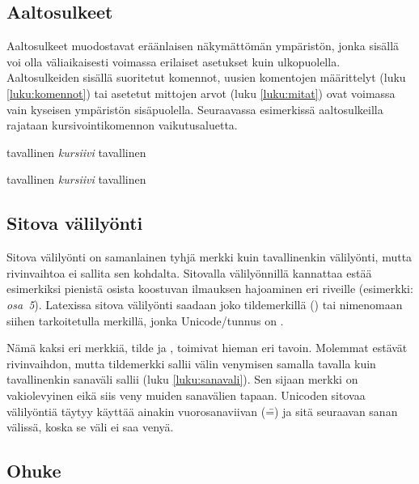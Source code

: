 \subsection{Aaltosulkeet}
\label{luku:aaltosulkeet}

Aaltosulkeet \mbox{\koodi{\{\}}} muodostavat eräänlaisen näkymättömän
ympäristön, jonka sisällä voi olla väliaikaisesti voimassa erilaiset
asetukset kuin ulkopuolella. Aaltosulkeiden sisällä suoritetut komennot,
uusien komentojen määrittelyt (luku \ref{luku:komennot}) tai asetetut
mittojen arvot (luku \ref{luku:mitat}) ovat voimassa vain kyseisen
ympäristön sisäpuolella. Seuraavassa esimerkissä aaltosulkeilla rajataan
kursivointikomennon  vaikutusaluetta.

\begin{koodilohkosis}
tavallinen {\itshape kursiivi} tavallinen
\end{koodilohkosis}

\begin{tulossis}
  tavallinen {\itshape kursiivi} tavallinen
\end{tulossis}

\subsection{Sitova välilyönti}

Sitova välilyönti on samanlainen tyhjä merkki kuin tavallinenkin
välilyönti, mutta rivinvaihtoa ei sallita sen kohdalta. Sitovalla
välilyönnillä kannattaa estää esimerkiksi pienistä osista koostuvan
ilmauksen hajoaminen eri riveille (esimerkki: \emph{osa~5}). Latexissa
sitova välilyönti saadaan joko tildemerkillä (\koodi{\textasciitilde})
tai nimenomaan siihen tarkoitetulla merkillä, jonka Unicode\-/tunnus on
.

Nämä kaksi eri merkkiä, tilde ja , toimivat hieman eri
tavoin. Molemmat estävät rivinvaihdon, mutta tildemerkki sallii välin
venymisen samalla tavalla kuin tavallinenkin sanaväli sallii (luku
\ref{luku:sanavali}). Sen sijaan merkki  on
vakiolevyinen eikä siis veny muiden sanavälien tapaan. Unicoden sitovaa
välilyöntiä  täytyy käyttää ainakin vuorosanaviivan
(\==) ja sitä seuraavan sanan välissä, koska se väli ei saa venyä.

\subsection{Ohuke}
\label{luku:ohuke}

